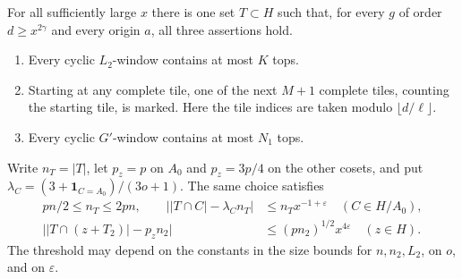 \begin{proposition}\label{orb:selection}
For all sufficiently large \(x\) there is one set \(T\subset H\)
such that, for every \(g\) of order \(d\ge x^{2\gamma}\) and every
origin \(a\), all three assertions hold.
\begin{enumerate}
\item Every cyclic \(L_2\)-window contains at most \(K\) tops.
\item Starting at any complete tile, one of the next \(M+1\) complete
tiles, counting the starting tile, is marked. Here the tile indices
are taken modulo \(\lfloor d/\ell\rfloor\).
\item Every cyclic \(G'\)-window contains at most \(N_1\) tops.
\end{enumerate}
Write \(n_T=|T|\), let \(p_z=p\) on \(A_0\) and \(p_z=3p/4\) on
the other cosets, and put \(\lambda_C=(3+\mathbf{1}_{C=A_0})/(3o+1)\).
The same choice satisfies
\begin{align}
  pn/2\le n_T\le 2pn,\qquad
  \big||T\cap C|-\lambda_C n_T\big|
      &\le n_T x^{-1+\varepsilon} \quad(C\in H/A_0), \label{orb:cosets}\\
 \big||T\cap(z+T_2)|-p_z n_2\big|
      &\le (pn_2)^{1/2} x^{4\varepsilon}\quad(z\in H).
       \label{orb:overlap-count}
\end{align}
The threshold may depend on the constants in the size bounds for
\(n,n_2,L_2\), on \(o\), and on \(\varepsilon\).
\end{proposition}

